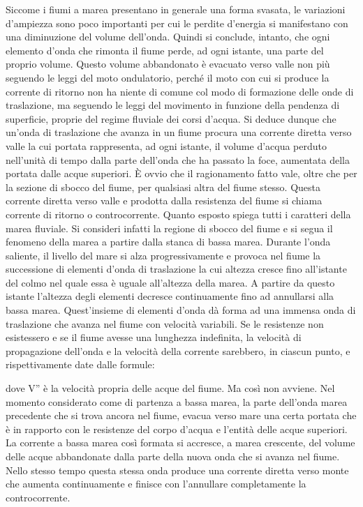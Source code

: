 \documentclass[a4paper]{article}
\begin{document}
Siccome i fiumi a marea presentano in generale una forma svasata, le variazioni d'ampiezza sono poco importanti per cui le perdite d'energia si manifestano con una diminuzione del volume dell'onda. Quindi si conclude, intanto, che ogni elemento d'onda che rimonta il fiume perde, ad ogni istante, una parte del proprio volume. Questo volume abbandonato è evacuato verso valle non più seguendo le leggi del moto ondulatorio, perché il moto con cui si produce la corrente di ritorno non ha niente di comune col modo di formazione delle onde di traslazione, ma seguendo le leggi del movimento in funzione della pendenza di superficie, proprie del regime fluviale dei corsi d'acqua. Si deduce dunque che un'onda di traslazione che avanza in un fiume procura una corrente diretta verso valle la cui portata rappresenta, ad ogni istante, il volume d'acqua perduto nell'unità di tempo dalla parte dell'onda che ha passato la foce, aumentata della portata dalle acque superiori. È ovvio che il ragionamento fatto vale, oltre che per la sezione di sbocco del fiume, per qualsiasi altra del fiume stesso. Questa corrente diretta verso valle e prodotta dalla resistenza del fiume si chiama corrente di ritorno o controcorrente. Quanto esposto spiega tutti i caratteri della marea fluviale. Si consideri infatti la regione di sbocco del fiume e si segua il fenomeno della marea a partire dalla stanca di bassa marea. Durante l'onda saliente, il livello del mare si alza progressivamente e provoca nel fiume la successione di elementi d'onda di traslazione la cui altezza cresce fino all'istante del colmo nel quale essa è uguale all'altezza della marea. A partire da questo istante l'altezza degli elementi decresce continuamente fino ad annullarsi alla bassa marea. Quest'insieme di elementi d'onda dà forma ad una immensa onda di traslazione che avanza nel fiume con velocità variabili. Se le resistenze non esistessero e se il fiume avesse una lunghezza indefinita, la velocità di propagazione dell'onda e la velocità della corrente sarebbero, in ciascun punto, e rispettivamente date dalle formule:

dove V'' è la velocità propria delle acque del fiume. Ma così non avviene. Nel momento considerato come di partenza a bassa marea, la parte dell'onda marea precedente che si trova ancora nel fiume, evacua verso mare una certa portata che è in rapporto con le resistenze del corpo d'acqua e l'entità delle acque superiori. La corrente a bassa marea così formata si accresce, a marea crescente, del volume delle acque abbandonate dalla parte della nuova onda che si avanza nel fiume. Nello stesso tempo questa stessa onda produce una corrente diretta verso monte che aumenta continuamente e finisce con l'annullare completamente la controcorrente.
\end{document}
